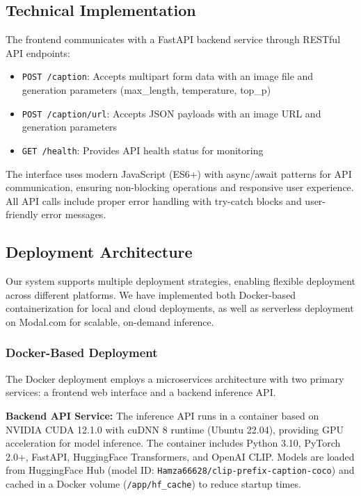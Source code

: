 \documentclass[runningheads]{llncs}
\begin{document}
\subsection{Technical Implementation}

The frontend communicates with a FastAPI backend service through RESTful API endpoints:

\begin{itemize}
\item \texttt{POST /caption}: Accepts multipart form data with an image file and generation parameters (max\_length, temperature, top\_p)
\item \texttt{POST /caption/url}: Accepts JSON payloads with an image URL and generation parameters
\item \texttt{GET /health}: Provides API health status for monitoring
\end{itemize}

The interface uses modern JavaScript (ES6+) with async/await patterns for API communication, ensuring non-blocking operations and responsive user experience. All API calls include proper error handling with try-catch blocks and user-friendly error messages.



\subsection{Deployment Architecture}

Our system supports multiple deployment strategies, enabling flexible deployment across different platforms. We have implemented both Docker-based containerization for local and cloud deployments, as well as serverless deployment on Modal.com for scalable, on-demand inference.

\subsubsection{Docker-Based Deployment}

The Docker deployment employs a microservices architecture with two primary services: a frontend web interface and a backend inference API.

\textbf{Backend API Service:} The inference API runs in a container based on NVIDIA CUDA 12.1.0 with cuDNN 8 runtime (Ubuntu 22.04), providing GPU acceleration for model inference. The container includes Python 3.10, PyTorch 2.0+, FastAPI, HuggingFace Transformers, and OpenAI CLIP. Models are loaded from HuggingFace Hub (model ID: \texttt{Hamza66628/clip-prefix-caption-coco}) and cached in a Docker volume (\texttt{/app/hf\_cache}) to reduce startup times.
\end{document}
